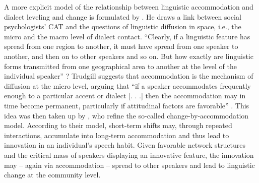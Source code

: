 \documentclass[output=paper,
modfonts
]{langscibook}
\begin{document}
A more explicit model of the relationship between linguistic accommodation and dialect leveling and change is formulated by \cite{trudgill_dialects_1986}. He draws a link between social psychologists’ CAT and the questions of linguistic diffusion in space, i.e., the micro and the macro level of dialect contact. ``Clearly, if a linguistic feature has spread from one region to another, it must have spread from one speaker to another, and then on to other speakers and so on. But how exactly are linguistic forms transmitted from one geographical area to another at the level of the individual speaker'' \citep[39]{trudgill_dialects_1986}? Trudgill suggests that accommodation is the mechanism of diffusion at the micro level, arguing that ``if a speaker accommodates frequently enough to a particular accent or dialect [. . .] then the accommodation may in time become permanent, particularly if attitudinal factors are favorable'' \citep[39]{trudgill_dialects_1986}. This idea was then taken up by \cite{auer_role_2005}, who refine the so-called change-by-accommodation model. According to their model, short-term shifts may, through repeated interactions, accumulate into long-term accommodation and thus lead to innovation in an individual's speech habit. Given favorable network structures and the critical mass of speakers displaying an innovative feature, the innovation may – again via accommodation – spread to other speakers and lead to linguistic change at the community level. 
% 
% 
% 
% 
% 
% 
% 
% 
% 
\end{document}

